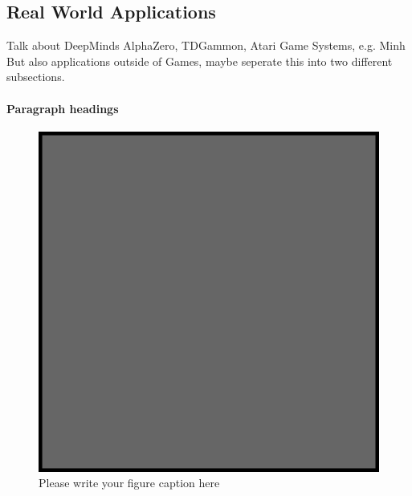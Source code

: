     \subsection{Real World Applications}
    \label{sec:games}
    Talk about DeepMinds AlphaZero, TDGammon, Atari Game Systems, e.g. Minh
    But also applications outside of Games, maybe seperate this into two different subsections.
    \paragraph{Paragraph headings}
    \begin{figure}
        \includegraphics{example.eps}
        \caption{Please write your figure caption here}
        \label{fig:1}
    \end{figure}
